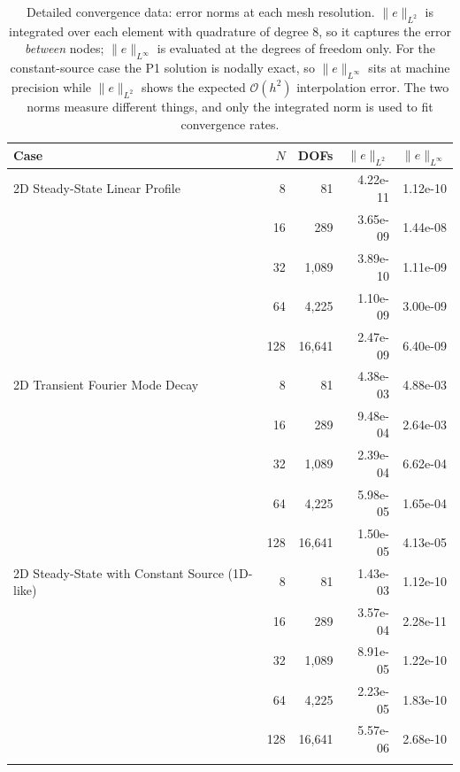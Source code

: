 \documentclass[preprint,review,12pt]{elsarticle}
\begin{document}
\begin{table}[htbp]
\centering\footnotesize
\caption{Detailed convergence data: error norms at each mesh resolution.  $\|e\|_{L^2}$ is integrated over each element with quadrature of degree 8, so it captures the error \emph{between} nodes; $\|e\|_{L^\infty}$ is evaluated at the degrees of freedom only.  For the constant-source case the P1 solution is nodally exact, so $\|e\|_{L^\infty}$ sits at machine precision while $\|e\|_{L^2}$ shows the expected $\mathcal{O}(h^2)$ interpolation error.  The two norms measure different things, and only the integrated norm is used to fit convergence rates.}
\label{tab:vv-detail}
\begin{tabular}{lrrrr}
\toprule
Case & $N$ & DOFs & $\|e\|_{L^2}$ & $\|e\|_{L^\infty}$ \\
\midrule
  2D Steady-State Linear Profile & 8 & 81 & 4.22e-11 & 1.12e-10 \\
   & 16 & 289 & 3.65e-09 & 1.44e-08 \\
   & 32 & 1,089 & 3.89e-10 & 1.11e-09 \\
   & 64 & 4,225 & 1.10e-09 & 3.00e-09 \\
   & 128 & 16,641 & 2.47e-09 & 6.40e-09 \\
\addlinespace
  2D Transient Fourier Mode Decay & 8 & 81 & 4.38e-03 & 4.88e-03 \\
   & 16 & 289 & 9.48e-04 & 2.64e-03 \\
   & 32 & 1,089 & 2.39e-04 & 6.62e-04 \\
   & 64 & 4,225 & 5.98e-05 & 1.65e-04 \\
   & 128 & 16,641 & 1.50e-05 & 4.13e-05 \\
\addlinespace
  2D Steady-State with Constant Source (1D-like) & 8 & 81 & 1.43e-03 & 1.12e-10 \\
   & 16 & 289 & 3.57e-04 & 2.28e-11 \\
   & 32 & 1,089 & 8.91e-05 & 1.22e-10 \\
   & 64 & 4,225 & 2.23e-05 & 1.83e-10 \\
   & 128 & 16,641 & 5.57e-06 & 2.68e-10 \\
\addlinespace
\bottomrule
\end{tabular}
\end{table}
\end{document}
